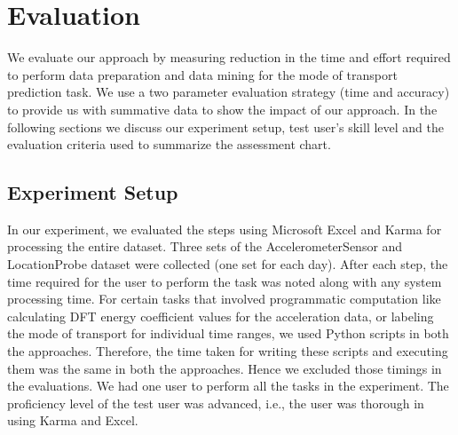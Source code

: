 \section{Evaluation}
We evaluate our approach by measuring reduction in the time and effort required to perform data preparation and data mining for the mode of transport prediction task. We use a two parameter evaluation strategy (time and accuracy) to provide us with summative data to show the impact of our approach. In the following sections we discuss our experiment setup, test user's skill level and the evaluation criteria used to summarize the assessment chart. 

\subsection{Experiment Setup}
In our experiment, we evaluated the steps using Microsoft Excel and Karma for processing the entire dataset. Three sets of the AccelerometerSensor and LocationProbe dataset were collected (one set for each day).  After each step, the time required for the user to perform the task was noted along with any system processing time. For certain tasks that involved programmatic computation like calculating DFT energy coefficient values for the acceleration data, or labeling the mode of transport for individual time ranges, we used Python scripts in both the approaches. Therefore, the time taken for writing these scripts and executing them was the same in both the approaches. Hence we excluded those timings in the evaluations. We had one user to perform all the tasks in the experiment. The proficiency level of the test user was advanced, i.e., the user was thorough in using Karma and Excel. 

